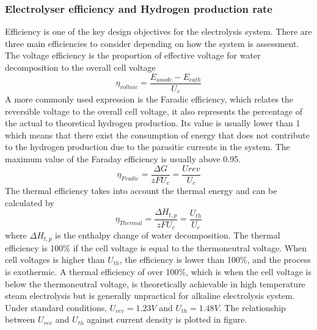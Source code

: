 \subsubsection{Electrolyser efficiency and Hydrogen production rate}  
Efficiency is one of the key design objectives for the electrolysis system. There are three main efficiencies to consider depending on how the system is assessment. The voltage efficiency is the proportion of effective voltage for water decomposition to the overall cell voltage
\begin{equation}
\eta_{voltaic} = \frac{E_{anode} - E_{cath} }{U_c}
\end{equation}
A more commonly used expression is the Faradic efficiency, which relates the reversible voltage to the overall cell voltage, it also represents the percentage of the actual to theoretical hydrogen production. Its value is usually lower than 1 which means that there exist the consumption of energy that does not contribute to the hydrogen production due to the parasitic currents in the system. The maximum value of the Faraday efficiency is usually above 0.95.
\begin{equation}
\eta_{Fradic} = \frac{\Delta G}{zFU_c} = \frac{U{rev}}{U_c} 
\end{equation}
The thermal efficiency takes into account the thermal energy and can be calculated by
\begin{equation}
\eta_{Thermal} = \frac{\Delta H_{t,p}}{zFU_c} = \frac{U_{th}}{U_c} 
\end{equation} 
where $\Delta H_{t,p}$ is the enthalpy change of water decomposition. The thermal efficiency is 100\% if the cell voltage is equal to the thermoneutral voltage. When cell voltages is higher than $U_{th}$, the efficiency is lower than 100\%, and the process is exothermic. A thermal efficiency of over 100\%, which is when the cell voltage is below the thermoneutral voltage,  is theoretically achievable in high temperature steam electrolysis but is generally unpractical for alkaline electrolysis system. Under standard conditions, $U_{rev} = 1.23V$ and $U_{th} = 1.48V$. The relationship between $U_{rev}$ and $U_{th}$ against current density is plotted in figure.
